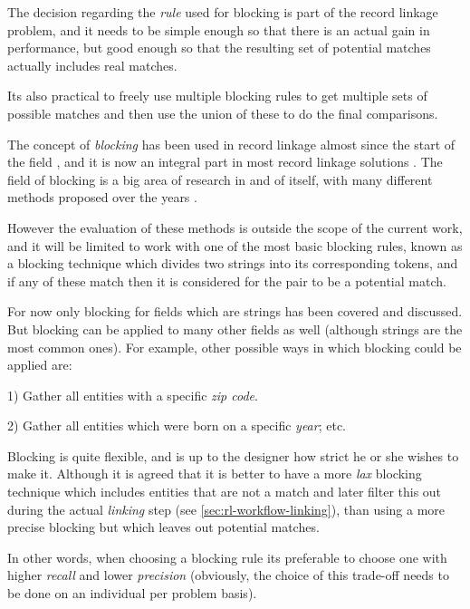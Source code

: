 \documentclass[epsfig,a4paper,11pt,titlepage,twoside,openany]{book}
\begin{document}
The decision regarding the \textit{rule} used for blocking is part of the record
linkage problem, and it needs to be simple enough so that there is an actual gain in performance, but good enough so that the resulting set of potential
matches actually includes real matches. 

Its also practical to freely use multiple blocking
rules to get multiple sets of possible matches and then use the union of these
to do the final comparisons.

The concept of \textit{blocking} has been used in record linkage almost since
the start of the field \cite{fellegi69_theor_recor_linkag}, and it is now an
integral part in most record linkage solutions \cite{winkler2006overview}. The
field of blocking is a big area of research in and of itself, with many
different methods proposed over the years
\cite{christen12_survey_index_techn_scalab_recor_linkag_dedup, Baxter2003ACO}.

However the evaluation of these methods is outside the scope of the current
work, and it will be limited to work with one of the most basic blocking rules,
known as a blocking technique which divides two strings into its corresponding
tokens, and if any of these match then it is considered for the pair to be a potential match.

For now only blocking for fields which are strings has been covered and discussed. But
blocking can be applied to many other fields as well (although strings are the
most common ones). For example, other possible ways in which blocking could be applied are: 

1) Gather all entities with a specific \textit{zip code}. 

2) Gather all entities which were born on a specific \textit{year}; etc.

Blocking is quite flexible, and is up to the designer how strict he or she wishes to make it.
Although it is agreed
\cite{christen12_survey_index_techn_scalab_recor_linkag_dedup} that it is better
to have a more \textit{lax} blocking technique which includes entities that are
not a match and later filter this out during the actual \textit{linking} step
(see \autoref{sec:rl-workflow-linking}), than using a more precise blocking but
which leaves out potential matches. 

In other words, when choosing a blocking
rule its preferable to choose one with higher \textit{recall} and lower \textit{precision}
(obviously, the choice of this trade-off needs to be done on an individual per problem
basis).
\end{document}
